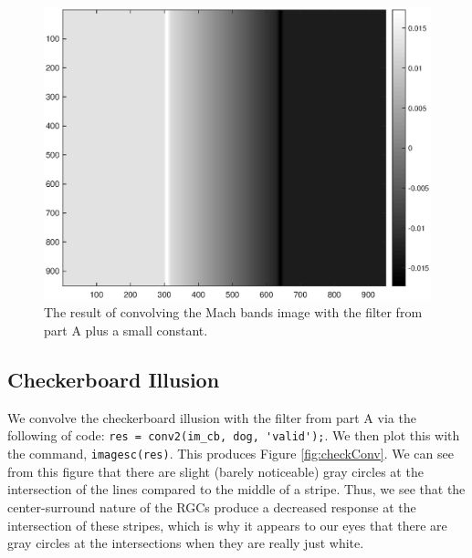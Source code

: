 \documentclass[11pt, oneside]{article}
\begin{document}
\begin{figure}[ht!]
\includegraphics[width=1\textwidth]{mach_dog_conv2.eps}
\caption{The result of convolving the Mach bands image with the filter from part A plus a small constant.}
\label{fig:machConv2}
\end{figure}

\subsection{Checkerboard Illusion}

We convolve the checkerboard illusion with the filter from part A via the following of code: \lstinline{res = conv2(im_cb, dog, 'valid');}. We then plot this with the command, \lstinline{imagesc(res)}. This produces Figure \ref{fig:checkConv}. We can see from this figure that there are slight (barely noticeable) gray circles at the intersection of the lines compared to the middle of a stripe. Thus, we see that the center-surround nature of the RGCs produce a decreased response at the intersection of these stripes, which is why it appears to our eyes that there are gray circles at the intersections when they are really just white.
\end{document}
